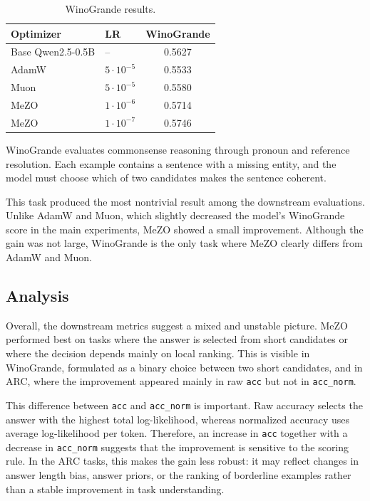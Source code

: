 \documentclass{article}
\begin{document}
\begin{table}[ht]
\centering
\begin{tabular}{llc}
\toprule
Optimizer & LR & WinoGrande \\
\midrule
Base Qwen2.5-0.5B & -- & 0.5627 \\
\midrule
AdamW    & $5 \cdot 10^{-5}$ & 0.5533 \\
Muon     & $5 \cdot 10^{-5}$ & 0.5580 \\
MeZO & $1 \cdot 10^{-6}$ & 0.5714 \\
MeZO & $1 \cdot 10^{-7}$ & 0.5746 \\
\bottomrule
\end{tabular}
\caption{WinoGrande results.}
\label{tab:winogrande-results}
\end{table}

WinoGrande evaluates commonsense reasoning through pronoun and reference resolution. Each example contains a sentence with a missing entity, and the model must choose which of two candidates makes the sentence coherent.

This task produced the most nontrivial result among the downstream evaluations. Unlike AdamW and Muon, which slightly decreased the model's WinoGrande score in the main experiments, MeZO showed a small improvement. Although the gain was not large, WinoGrande is the only task where MeZO clearly differs from AdamW and Muon.

\subsection{Analysis}
Overall, the downstream metrics suggest a mixed and unstable picture. MeZO performed best on tasks where the answer is selected from short candidates or where the decision depends mainly on local ranking. This is visible in WinoGrande, formulated as a binary choice between two short candidates, and in ARC, where the improvement appeared mainly in raw \texttt{acc} but not in \texttt{acc\_norm}.

This difference between \texttt{acc} and \texttt{acc\_norm} is important. Raw accuracy selects the answer with the highest total log-likelihood, whereas normalized accuracy uses average log-likelihood per token. Therefore, an increase in \texttt{acc} together with a decrease in \texttt{acc\_norm} suggests that the improvement is sensitive to the scoring rule. In the ARC tasks, this makes the gain less robust: it may reflect changes in answer length bias, answer priors, or the ranking of borderline examples rather than a stable improvement in task understanding.
\end{document}
